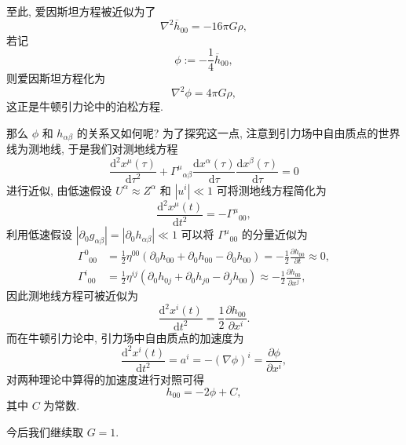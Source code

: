 至此, 爱因斯坦方程被近似为了
\[ \nabla^2\overline{h}_{00}=-16\pi G\rho, \] 
若记
\[ \phi:=-\frac{1}{4}\overline{h}_{00}, \] 
则爱因斯坦方程化为
\[ \nabla^2\phi=4\pi G\rho, \] 
这正是牛顿引力论中的泊松方程.

那么 $\phi$ 和 $h_{\alpha\beta}$ 的关系又如何呢? 为了探究这一点, 注意到引力场中自由质点的世界线为测地线, 于是我们对测地线方程
\[ \frac{\mathrm{d}^2 x^\mu(\tau)}{\mathrm{d}\tau^2 }+\Gamma^{\mu}{}_{\alpha\beta}\frac{\mathrm{d} x^{\alpha}(\tau)}{\mathrm{d} \tau}\frac{\mathrm{d} x^{\beta}(\tau)}{\mathrm{d} \tau}=0 \] 
进行近似, 由低速假设 $U^{\alpha}\approx Z^{\alpha}$ 和 $|u^i|\ll 1$ 可将测地线方程简化为
\[ \frac{\mathrm{d}^2 x^{\mu}(t)}{\mathrm{d} t^2}=-\Gamma^{\mu}{}_{00}, \]
利用低速假设 $|\partial_0g_{\alpha\beta}|=|\partial_0h_{\alpha\beta}|\ll 1$ 可以将 $\Gamma^{\mu}{}_{00}$ 的分量近似为
\begin{align*}
	\Gamma^{0}{}_{00} &= \frac{1}{2}\eta^{00}(\partial_0h_{00}+\partial_0h_{00}-\partial_0h_{00})=-\frac{1}{2}\frac{\partial h_{00}}{\partial t}\approx 0,\\
	\Gamma^{i}{}_{00} &= \frac{1}{2}\eta^{ij}(\partial_0h_{0j}+\partial_0h_{j0}-\partial_jh_{00})\approx-\frac{1}{2}\frac{\partial h_{00}}{\partial x^j},
\end{align*}
因此测地线方程可被近似为
\[ \frac{\mathrm{d}^2 x^i(t)}{\mathrm{d} t^2}=\frac{1}{2}\frac{\partial h_{00}}{\partial x^i}. \] 
而在牛顿引力论中, 引力场中自由质点的加速度为
\[ \frac{\mathrm{d}^2 x^i(t)}{\mathrm{d} t^2}=a^i=-(\nabla\phi)^i=\frac{\partial \phi}{\partial x^i}, \] 
对两种理论中算得的加速度进行对照可得
\[ \label{E-N} h_{00}=-2\phi+C, \tag{$\phi$}\] 
其中 $C$ 为常数.

今后我们继续取 $G=1$.

